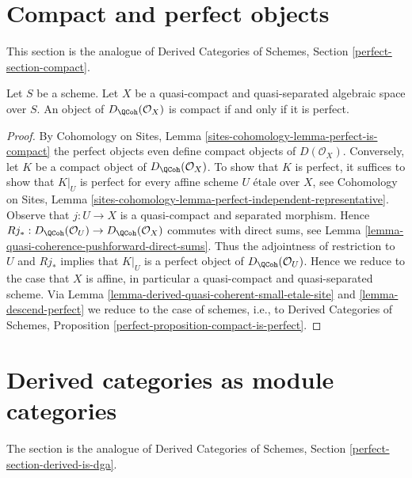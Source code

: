 \section{Compact and perfect objects}
\label{section-compact}

\noindent
This section is the analogue of
Derived Categories of Schemes, Section \ref{perfect-section-compact}.

\begin{proposition}
\label{proposition-compact-is-perfect}
Let $S$ be a scheme.
Let $X$ be a quasi-compact and quasi-separated algebraic space over $S$.
An object of $D_\QCoh(\mathcal{O}_X)$ is compact
if and only if it is perfect.
\end{proposition}

\begin{proof}
By Cohomology on Sites, Lemma \ref{sites-cohomology-lemma-perfect-is-compact}
the perfect objects even define compact objects of $D(\mathcal{O}_X)$.
Conversely, let $K$ be a compact object of $D_\QCoh(\mathcal{O}_X)$.
To show that $K$ is perfect, it suffices to show that
$K|_U$ is perfect for every affine scheme $U$ \'etale over $X$, see
Cohomology on Sites, Lemma
\ref{sites-cohomology-lemma-perfect-independent-representative}.
Observe that $j : U \to X$ is a quasi-compact and separated morphism.
Hence
$Rj_* : D_\QCoh(\mathcal{O}_U) \to D_\QCoh(\mathcal{O}_X)$
commutes with direct sums, see
Lemma \ref{lemma-quasi-coherence-pushforward-direct-sums}.
Thus the adjointness of restriction to $U$ and $Rj_*$ implies that
$K|_U$ is a perfect object of $D_\QCoh(\mathcal{O}_U)$.
Hence we reduce to the case that $X$ is affine, in particular a
quasi-compact and quasi-separated scheme. Via
Lemma \ref{lemma-derived-quasi-coherent-small-etale-site} and
\ref{lemma-descend-perfect}
we reduce to the case of schemes, i.e., to
Derived Categories of Schemes, Proposition
\ref{perfect-proposition-compact-is-perfect}.
\end{proof}











\section{Derived categories as module categories}
\label{section-derived-is-dga}

\noindent
The section is the analogue of
Derived Categories of Schemes, Section \ref{perfect-section-derived-is-dga}.

